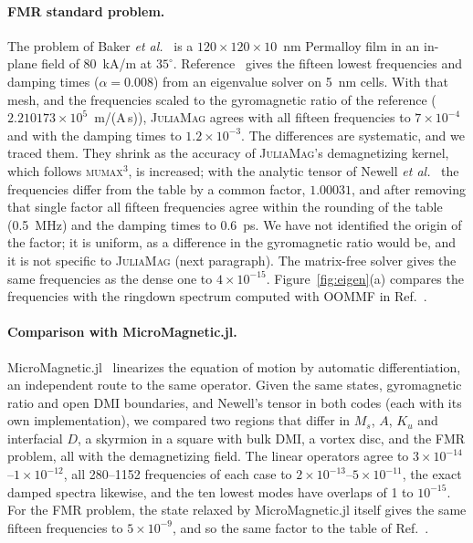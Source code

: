 \documentclass{article}      %
\newcommand{\JuliaMag}{\textsc{JuliaMag}}
\newcommand{\mumax}{\textsc{mumax}$^3$}
\newcommand{\oommf}{\textsc{OOMMF}}
\begin{document}
\paragraph{FMR standard problem.}
The problem of Baker \textit{et al.}~\cite{baker2017} is a $120\times120\times10$~nm Permalloy film in an
in-plane field of 80~kA/m at $35^\circ$. Reference~\cite{baker2017} gives the fifteen lowest
frequencies and damping times ($\alpha=0.008$) from an eigenvalue solver on 5~nm cells. With that
mesh, and the frequencies scaled to the gyromagnetic ratio of the reference
($2.210173\times10^5$~m/(A\,s)), \JuliaMag{} agrees with all fifteen frequencies to
$7\times10^{-4}$ and with the damping times to $1.2\times10^{-3}$. The differences are
systematic, and we traced them. They shrink as the accuracy of \JuliaMag's demagnetizing
kernel, which follows \mumax, is increased; with the analytic tensor of
Newell \textit{et al.}~\cite{newell1993} the frequencies differ from the table by a common factor,
$1.00031$, and after removing that single factor all fifteen frequencies agree within the rounding of
the table (0.5~MHz) and the damping times to 0.6~ps. We have not identified the
origin of the factor; it is uniform, as a difference in the gyromagnetic ratio would be, and it is not
specific to \JuliaMag{} (next paragraph). The matrix-free solver gives the same frequencies as the dense one to $4\times10^{-15}$.
Figure~\ref{fig:eigen}(a) compares the frequencies with the ringdown spectrum computed with
\oommf{} in Ref.~\cite{baker2017}.

\paragraph{Comparison with MicroMagnetic.jl.}
MicroMagnetic.jl~\cite{wang2024} linearizes the equation of motion by automatic differentiation, an
independent route to the same operator. Given the same states, gyromagnetic ratio and open DMI
boundaries, and Newell's tensor in both codes (each with its own implementation), we compared
two regions that differ in $M_s$, $A$, $K_u$ and interfacial $D$, a skyrmion in a square with bulk
DMI, a vortex disc, and the FMR problem, all with the demagnetizing field. The linear operators agree to
$3\times10^{-14}$--$1\times10^{-12}$, all 280--1152 frequencies of each case to
$2\times10^{-13}$--$5\times10^{-11}$, the exact damped spectra likewise, and the ten lowest modes
have overlaps of 1 to $10^{-15}$. For the FMR problem, the state relaxed by MicroMagnetic.jl itself gives
the same fifteen frequencies to $5\times10^{-9}$, and so the same factor to the table of
Ref.~\cite{baker2017}.
\end{document}
